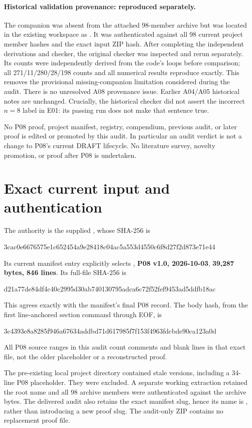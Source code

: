 \documentclass[11pt]{article}
\newcommand{\sha}[2]{\par{\small\ttfamily #1\allowbreak #2}\par}
\begin{document}
\paragraph{Historical validation provenance: reproduced separately.}
The companion was absent from the attached 98-member archive but was
located in the existing workspace as .
It was authenticated against all 98 current project member hashes and
the exact input ZIP hash. After completing the independent derivations
and checker, the original checker was inspected and rerun separately.
Its counts were independently derived from the code's loops before
comparison; all 271/11/280/28/198 counts and all numerical results
reproduce exactly. This removes the provisional missing-companion
limitation considered during the audit. There is no unresolved A08
provenance issue. Earlier A04/A05 historical notes are unchanged.
Crucially, the historical checker did not assert the incorrect $n=8$
label in E01: its passing run does not make that sentence true.

No P08 proof, project manifest, registry, compendium, previous audit, or
later proof is edited or promoted by this audit. In particular an audit
verdict is not a change to P08's current DRAFT lifecycle. No literature
survey, novelty promotion, or proof after P08 is undertaken.

\section{Exact current input and authentication}
The authority is the supplied ,
whose SHA-256 is
\sha{3cac0e6676575e1c652454a9e28418c04}{ac5a553d4550c6f8d27f2d873e71e44}
Its current manifest entry explicitly selects
, \textbf{P08 v1.0,
2026-10-03}, \textbf{39,287 bytes, 846 lines}. Its full-file SHA-256 is
\sha{d21a77de84df4c40c2995d30ab7401307}{95adca6c72f52fef9453ad5ddfb18ac}
This agrees exactly with the manifest's final P08 record. The body hash,
from the first line-anchored section command through EOF, is
\sha{3c4393e8a8285f946a67634addbd71d61}{7985f7f153f4963fdcbde90ca123a0d}
All P08 source ranges in this audit count comments and blank lines in
that exact file, not the older placeholder or a reconstructed proof.

The pre-existing local project directory contained stale versions,
including a 34-line P08 placeholder. They were excluded. A separate
working extraction retained the root name 
and all 98 archive members were authenticated against the archive bytes.
The delivered audit also retains the exact manifest slug, hence its name
is , rather than introducing
a new proof slug. The audit-only ZIP contains no replacement proof file.
\end{document}
